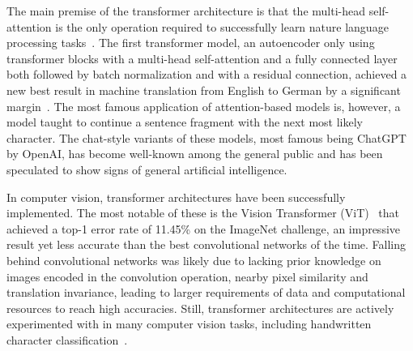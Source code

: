 \documentclass[english,twoside,openright]{UH_DS_MSc}
\begin{document}
The main premise of the transformer architecture is that the multi-head self-attention 
is the only operation required to successfully learn nature language processing tasks~\cite{attention_is_all_you_need}. The first transformer model,
an autoencoder only using transformer blocks with a multi-head self-attention and 
a fully connected layer both followed by batch normalization and with a residual connection, achieved a new best 
result in machine translation from English to German by a significant margin~\cite{attention_is_all_you_need}.
The most famous application of attention-based models is, however, a model taught to continue a sentence fragment with the next most 
likely character. The chat-style variants of these models, most famous being ChatGPT by OpenAI, has become well-known among the general public and 
has been speculated to show signs of general artificial intelligence.

In computer vision, transformer architectures have been successfully implemented.
The most notable of these is the Vision Transformer (ViT)~\cite{vit} that achieved a top-1 error rate of
11.45\% on the ImageNet challenge, an impressive result yet less accurate than the best convolutional networks of the time.
Falling behind convolutional networks was likely due to lacking prior knowledge on images encoded in the convolution operation, nearby pixel similarity and
translation invariance, leading to larger requirements of data and computational resources 
to reach high accuracies. Still, transformer architectures are actively experimented with in many computer vision tasks, including handwritten character classification~\cite{9thuonPalm}.
\end{document}
